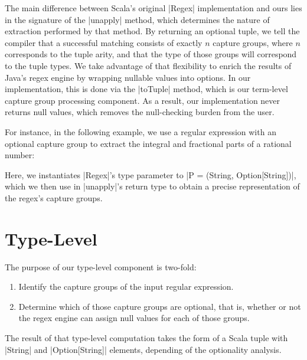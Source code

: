The main difference between Scala's original |Regex| implementation and ours lies in the signature of the |unapply| method, which determines the nature of extraction performed by that method.
By returning an optional tuple, we tell the compiler that a successful matching consists of exactly $n$ capture groups, where $n$ corresponds to the tuple arity, and that the type of those groups will correspond to the tuple types.
We take advantage of that flexibility to enrich the results of Java's regex engine by wrapping nullable values into options.
In our implementation, this is done via the |toTuple| method, which is our
term-level capture group processing component.
As a result, our implementation never returns null values, which removes the null-checking burden from the user.

For instance, in the following example, we use a regular expression with an optional capture group to extract the integral and fractional parts of a rational number:

\regexRational

\noindent
Here, we instantiates |Regex|'s type parameter to |P = (String, Option[String])|, which we then use in |unapply|'s return type to obtain a precise representation of the regex's capture groups.

\section{Type-Level}
\label{sec:type-level}

The purpose of our type-level component is two-fold:

\begin{enumerate}
  \item Identify the capture groups of the input regular expression.
  \item Determine which of those capture groups are optional, that is, whether or not the regex engine can assign null values for each of those groups.
\end{enumerate}

\noindent
The result of that type-level computation takes the form of a Scala tuple with |String| and |Option[String]| elements, depending of the optionality analysis.

